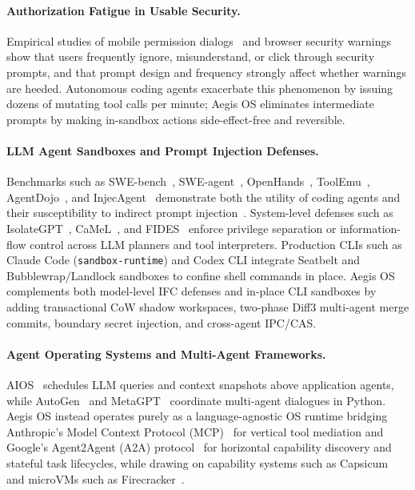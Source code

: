 \documentclass[10pt,twocolumn]{article}
\begin{document}
\paragraph{Authorization Fatigue in Usable Security.} Empirical studies of mobile permission dialogs~\cite{felt2012android} and browser security warnings~\cite{akhawe2013alice} show that users frequently ignore, misunderstand, or click through security prompts, and that prompt design and frequency strongly affect whether warnings are heeded. Autonomous coding agents exacerbate this phenomenon by issuing dozens of mutating tool calls per minute; Aegis OS eliminates intermediate prompts by making in-sandbox actions side-effect-free and reversible.

\paragraph{LLM Agent Sandboxes and Prompt Injection Defenses.} Benchmarks such as SWE-bench~\cite{jimenez2024swebench}, SWE-agent~\cite{yang2024sweagent}, OpenHands~\cite{wang2025openhands}, ToolEmu~\cite{ruan2024toolemu}, AgentDojo~\cite{debenedetti2024agentdojo}, and InjecAgent~\cite{zhan2024injecagent} demonstrate both the utility of coding agents and their susceptibility to indirect prompt injection~\cite{greshake2023not}. System-level defenses such as IsolateGPT~\cite{wu2024secgpt}, CaMeL~\cite{debenedetti2025camel}, and FIDES~\cite{costa2025fides} enforce privilege separation or information-flow control across LLM planners and tool interpreters. Production CLIs such as Claude Code (\texttt{sandbox-runtime}) and Codex CLI integrate Seatbelt and Bubblewrap/Landlock sandboxes to confine shell commands in place. Aegis OS complements both model-level IFC defenses and in-place CLI sandboxes by adding transactional CoW shadow workspaces, two-phase Diff3 multi-agent merge commits, boundary secret injection, and cross-agent IPC/CAS.

\paragraph{Agent Operating Systems and Multi-Agent Frameworks.} AIOS~\cite{mei2024aios} schedules LLM queries and context snapshots above application agents, while AutoGen~\cite{wu2023autogen} and MetaGPT~\cite{hong2024metagpt} coordinate multi-agent dialogues in Python. Aegis OS instead operates purely as a language-agnostic OS runtime bridging Anthropic's Model Context Protocol (MCP)~\cite{anthropic2024mcp} for vertical tool mediation and Google's Agent2Agent (A2A) protocol~\cite{google2025a2a} for horizontal capability discovery and stateful task lifecycles, while drawing on capability systems such as Capsicum~\cite{watson2010capsicum} and microVMs such as Firecracker~\cite{agache2020firecracker}.
\end{document}
